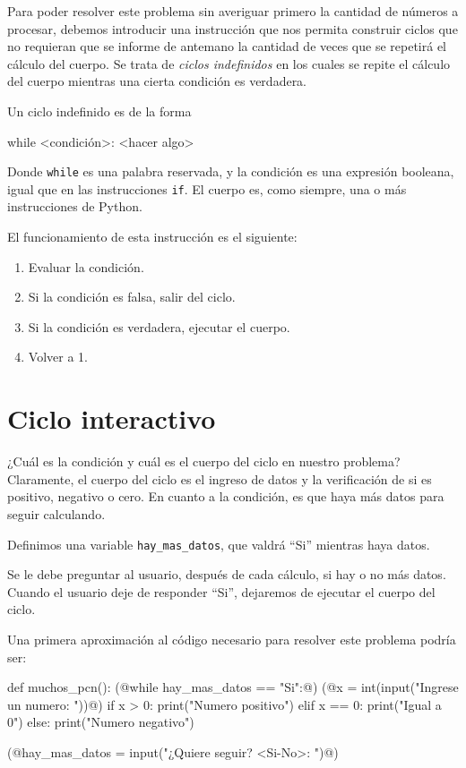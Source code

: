 Para poder resolver este problema sin averiguar primero la cantidad de números
a procesar, debemos introducir una instrucción que nos permita construir ciclos
que no requieran que se informe de antemano la cantidad de veces que se
repetirá el cálculo del cuerpo.  Se trata de \emph{ciclos indefinidos} en los
cuales se repite el cálculo del cuerpo mientras una cierta condición es
verdadera.

Un ciclo indefinido es de la forma

\begin{codigo-python-sn}
while <condición>:
    <hacer algo>
\end{codigo-python-sn}

Donde \lstinline+while+ es una palabra reservada, y la condición es una expresión
booleana, igual que en las instrucciones \lstinline!if!. El cuerpo es, como
siempre, una o más instrucciones de Python.

El funcionamiento de esta instrucción es el siguiente:

\begin{enumerate}
\item Evaluar la condición.
\item Si la condición es falsa, salir del ciclo.
\item Si la condición es verdadera, ejecutar el cuerpo.
\item Volver a 1.
\end{enumerate}

\section{Ciclo interactivo}

¿Cuál es la condición y cuál es el cuerpo del ciclo en nuestro problema?
Claramente, el cuerpo del ciclo es el ingreso de datos y la verificación de si
es positivo, negativo o cero.  En cuanto a la condición, es que haya más datos
para seguir calculando.

Definimos una variable \lstinline!hay_mas_datos!, que valdrá ``Si'' mientras
haya datos.

Se le debe preguntar al usuario, después de cada cálculo, si hay o no más datos.
Cuando el usuario deje de responder ``Si'', dejaremos de ejecutar el cuerpo del
ciclo.

Una primera aproximación al código necesario para resolver este problema podría
ser:

\begin{codigo-python-sn}
def muchos_pcn():
    (@while hay_mas_datos == "Si":@)
        (@x = int(input("Ingrese un numero: "))@)
        if x > 0:
            print("Numero positivo")
        elif x == 0:
            print("Igual a 0")
        else:
            print("Numero negativo")

        (@hay_mas_datos = input("¿Quiere seguir? <Si-No>: ")@)
\end{codigo-python-sn}

